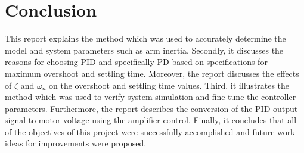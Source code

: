 \section{Conclusion}

This report explains the method which was used to accurately determine the model and system parameters such as arm inertia. 
Secondly, it discusses the reasons for choosing PID and specifically PD based on specifications for maximum overshoot and settling time. 
Moreover, the report discusses the effects of $\zeta$ and $\omega_n$ on the overshoot and settling time values. 
Third, it illustrates the method which was used to verify system simulation and fine tune the controller parameters. 
Furthermore, the report describes the conversion of the PID output signal to motor voltage using the amplifier control. 
Finally, it concludes that all of the objectives of this project were successfully accomplished and future work ideas for improvements were proposed.

